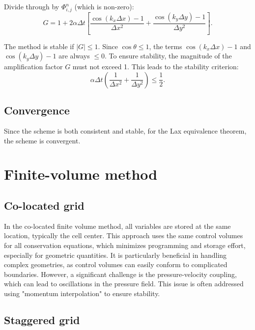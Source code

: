 \documentclass{article}
\begin{document}
Divide through by \( \Phi_{i,j}^n \) (which is non-zero):
\begin{equation}
G = 1 + 2 \alpha \Delta t \left[
\frac{\cos(k_x \Delta x) - 1}{\Delta x^2} + \frac{\cos(k_y \Delta y) - 1}{\Delta y^2}
\right].
\end{equation}

The method is stable if \( |G| \leq 1 \). Since \( \cos \theta \leq 1 \), the terms \( \cos(k_x \Delta x) - 1 \) and \( \cos(k_y \Delta y) - 1 \) are always \( \leq 0 \). To ensure stability, the magnitude of the amplification factor \( G \) must not exceed 1. This leads to the stability criterion:
\begin{equation}
\alpha \Delta t \left( \frac{1}{\Delta x^2} + \frac{1}{\Delta y^2} \right) \leq \frac{1}{2}.
\end{equation}

\subsection{ Convergence}
Since the scheme is both consistent and stable, for the Lax equivalence theorem, the scheme is convergent.

\section{Finite-volume method}

\subsection{Co-located grid}

In the co-located finite volume method, all variables are stored at the same location, typically the cell center. This approach uses the 
same control volumes for all conservation equations, which minimizes programming and storage effort, especially for geometric quantities. 
It is particularly beneficial in handling complex geometries, as control volumes can easily conform to complicated boundaries. However, 
a significant challenge is the pressure-velocity coupling, which can lead to oscillations in the pressure field. This issue is often 
addressed using "momentum interpolation" to ensure stability. 

\subsection{Staggered grid}
\end{document}
